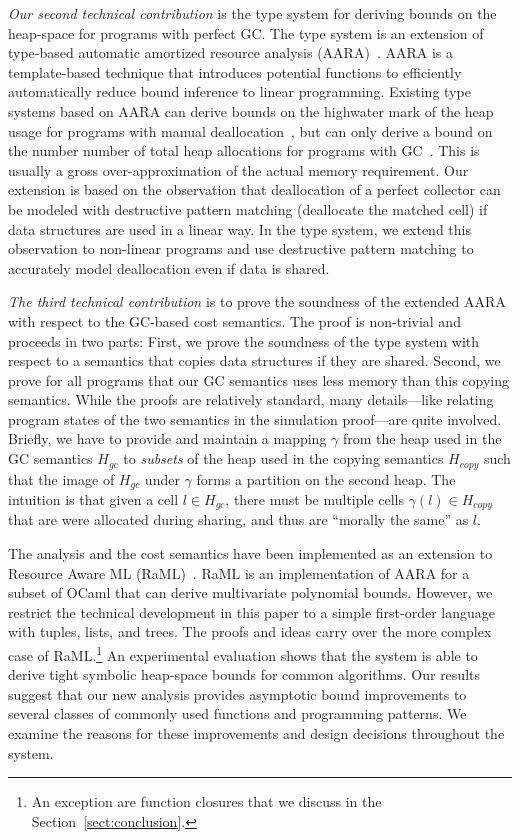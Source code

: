 \documentclass{easychair}
\theoremstyle{definition}
\begin{document}
\emph{Our second technical contribution} is the type system for
deriving bounds on the heap-space for programs with perfect GC. The
type system is an extension of type-based automatic amortized resource
analysis
(AARA)~\cite{Jost03,Jost10,VasconcelosJFH15,HoffmannAH10,HoffmannW15,NgoDFH16}. AARA
is a template-based technique that introduces potential functions to
efficiently automatically reduce bound inference to linear
programming. Existing type systems based on AARA can derive bounds on
the highwater mark of the heap usage for programs with manual
deallocation~\cite{Jost10}, but can only derive a bound on the number
number of total heap allocations for programs with
GC~\cite{HoffmannW15}. This is usually a gross over-approximation of
the actual memory requirement. Our extension is based on the
observation that deallocation of a perfect collector can be modeled
with destructive pattern matching (deallocate the matched cell) if
data structures are used in a linear way. In the type system, we
extend this observation to non-linear programs and use destructive
pattern matching to accurately model deallocation even if data is
shared.

\emph{The third technical contribution} is to prove the soundness of
the extended AARA with respect to the GC-based cost semantics. The
proof is non-trivial and proceeds in two parts: First, we prove the
soundness of the type system with respect to a semantics that copies
data structures if they are shared. Second, we prove for all programs
that our GC semantics uses less memory than this copying
semantics. While the proofs are relatively standard, many
details---like relating program states of the two semantics in the
simulation proof---are quite involved. Briefly, we have to provide and maintain 
a mapping $\gamma$ from the heap used in the GC semantics $H_{gc}$ to \emph{subsets} of
the heap used in the copying semantics $H_{copy}$ such that the image of 
$H_{gc}$ under $\gamma$ forms a partition on the second heap. The intuition is that 
given a cell $l \in H_{gc}$, there must be multiple cells $\gamma(l) \in H_{copy}$  
that are were allocated during sharing, and thus are ``morally the same'' as $l$.

The analysis and the cost semantics have been implemented as an
extension to Resource Aware ML (RaML)~\cite{HoffmannAH10,HoffmannW15}. RaML is an
implementation of AARA for a subset of OCaml that can derive
multivariate polynomial bounds. However, we restrict the technical
development in this paper to a simple first-order language with
tuples, lists, and trees. The proofs and ideas carry over the more
complex case of RaML.\footnote{An exception are function closures that
  we discuss in the Section~\ref{sect:conclusion}.}
%
An experimental evaluation shows that the system is able to derive
tight symbolic heap-space bounds for common algorithms. Our results
suggest that our new analysis provides asymptotic bound improvements
to several classes of commonly used functions and programming
patterns. We examine the reasons for these improvements and design
decisions throughout the system.
\end{document}
